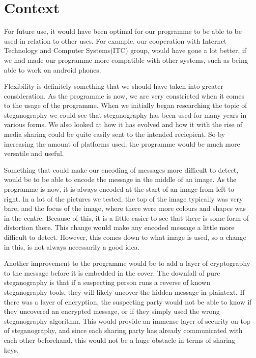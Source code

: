 \section{Context}
For future use, it would have been optimal for our programme to be able to be used in relation to other uses.
For example, our cooperation with Internet Technology and Computer Systems(ITC) group, would have gone a lot better, if we had made our programme more compatible with other systems, such as being able to work on android phones.

Flexibility is definitely something that we should have taken into greater consideration.
As the programme is now, we are very constricted when it comes to the usage of the programme.
When we initially began researching the topic of steganography we could see that steganography has been used for many years in various forms.
We also looked at how it has evolved and how it with the rise of media sharing could be quite easily sent to the intended reciepient.
So by increasing the amount of platforms used, the programme would be much more versatile and useful.

Something that could make our encoding of messages more difficult to detect, would be to be able to encode the message in the middle of an image.
As the programme is now, it is always encoded at the start of an image from left to right.
In a lot of the pictures we tested, the top of the image typically was very bare, and the focus of the image, where there were more colours and shapes was in the centre.
Because of this, it is a little easier to see that there is some form of distortion there.
This change would make any encoded message a little more difficult to detect.
However, this comes down to what image is used, so a change in this, is not always necessarily a good idea.

Another improvement to the programme would be to add a layer of cryptography to the message before it is embedded in the cover.
The downfall of pure steganography is that if a suspecting person runs a reverse of known steganography tools, they will likely uncover the hidden message in plaintext.
If there was a layer of encryption, the suspecting party would not be able to know if they uncovered an encrypted message, or if they simply used the wrong steganography algorithm.
This would provide an immense layer of security on top of steganography, and since each sharing party has already communicated with each other beforehand, this would not be a huge obstacle in terms of sharing keys.
